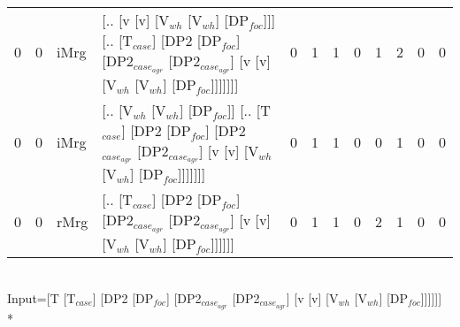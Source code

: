\begin{tabularx}{\linewidth}{rrlXrrrrrrrr}
   0 &   0 & iMrg & [.. [v [v] [V$_{wh}$ [V$_{wh}$] [DP$_{foc}$]]] [.. [T$_{case}$] [DP2 [DP$_{foc}$] [DP2$_{case_{agr}}$ [DP2$_{case_{agr}}$] [v [v] [V$_{wh}$ [V$_{wh}$] [DP$_{foc}$]]]]]]]                                              &            0 &             1 &             1 &              0 &            1 &             2 &              0 &            0 \\
   0 &   0 & iMrg & [.. [V$_{wh}$ [V$_{wh}$] [DP$_{foc}$]] [.. [T$_{case}$] [DP2 [DP$_{foc}$] [DP2$_{case_{agr}}$ [DP2$_{case_{agr}}$] [v [v] [V$_{wh}$ [V$_{wh}$] [DP$_{foc}$]]]]]]]                                                      &            0 &             1 &             1 &              0 &            0 &             1 &              0 &            0 \\
   0 &   0 & rMrg & [.. [T$_{case}$] [DP2 [DP$_{foc}$] [DP2$_{case_{agr}}$ [DP2$_{case_{agr}}$] [v [v] [V$_{wh}$ [V$_{wh}$] [DP$_{foc}$]]]]]]                                                                                  &            0 &             1 &             1 &              0 &            2 &             1 &              0 &            0 \\
\hline
\end{tabularx}\endgroup\\
\begingroup\scriptsize Input=[T [T$_{case}$] [DP2 [DP$_{foc}$] [DP2$_{case_{agr}}$ [DP2$_{case_{agr}}$] [v [v] [V$_{wh}$ [V$_{wh}$] [DP$_{foc}$]]]]]]\\*
